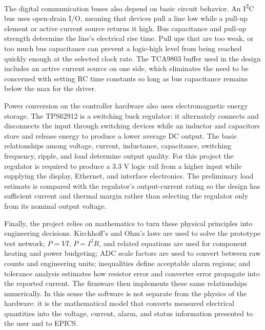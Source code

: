The digital communication buses also depend on basic circuit behavior. An
I\textsuperscript{2}C bus uses open-drain I/O, meaning that devices pull a
line low while a pull-up element or active current source returns it high. Bus
capacitance and pull-up strength determine the line's electrical rise time. Pull ups that are too weak, or too much bus capacitance can prevent a logic-high level from being
reached quickly enough at the selected clock rate. The TCA9803 buffer used in
the design includes an active current source on one side, which eliminates the need to be concerned with setting RC time constants so long as bus capacitance remains below the max for the driver.

Power conversion on the controller hardware also uses electromagnetic energy
storage. The TPS62912 is a switching buck regulator: it alternately connects and
disconnects the input through switching devices while an inductor and capacitors
store and release energy to produce a lower average DC output. The basic
relationships among voltage, current, inductance, capacitance, switching
frequency, ripple, and load determine output quality. For this project the regulator is required to produce a 3.3 V logic rail from a higher input while supplying the display, Ethernet, and interface electronics. The preliminary load estimate is compared with the regulator's output-current rating so the design has sufficient current and thermal margin rather than selecting the regulator only from its nominal output voltage.

Finally, the project relies on mathematics to turn these physical principles
into engineering decisions. Kirchhoff's and Ohm's laws are used to solve the
prototype test network; \(P=VI\), \(P=I^2R\), and related equations are used for
component heating and power budgeting; ADC scale factors are used to convert
between raw counts and engineering units; inequalities define acceptable alarm
regions; and tolerance analysis estimates how resistor error and converter error
propagate into the reported current. The firmware then implements these same
relationships numerically. In this sense the software is not separate from the
physics of the hardware: it is the mathematical model that converts measured
electrical quantities into the voltage, current, alarm, and status information
presented to the user and to EPICS.
